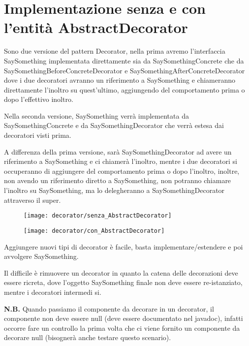 \section{Implementazione senza e con l'entità AbstractDecorator}

Sono due versione del pattern Decorator, nella prima avremo l'interfaccia SaySomething implementata direttamente sia da SaySomethingConcrete che da 
SaySomethingBeforeConcreteDecorator e SaySomethingAfterConcreteDecorator dove i due decoratori avranno un riferimento a SaySomething e chiameranno direttamente 
l'inoltro su quest'ultimo, aggiungendo del comportamento prima o dopo l'effettivo inoltro.

Nella seconda versione, SaySomething verrà implementata da SaySomethingConcrete e da SaySomethingDecorator che verrà estesa dai decoratori visti prima.

A differenza della prima versione, sarà SaySomethingDecorator ad avere un riferimento a SaySomething e ci chiamerà l'inoltro, mentre i due decoratori si occuperanno di 
aggiungere del comportamento prima o dopo l'inoltro, inoltre, non avendo un riferimento diretto a SaySomething, non potranno chiamare l'inoltro su SaySomething, ma lo 
delegheranno a SaySomethingDecorator attraverso il super.

\begin{figure}[H]
\begin{minipage}[c]{9cm}
    \texttt{[image: decorator/senza\_AbstractDecorator]}
\end{minipage}
\hfill
\begin{minipage}[c]{8cm}
    \texttt{[image: decorator/con\_AbstractDecorator]}
\end{minipage}
\end{figure}

Aggiungere nuovi tipi di decorator è facile, basta implementare/estendere e poi avvolgere SaySomething.

Il difficile è rimuovere un decorator in quanto la catena delle decorazioni deve essere ricreta, dove l'oggetto SaySomething finale non deve essere re-istanziato, 
mentre i decoratori intermedi si.
\medskip

\textbf{N.B.} Quando passiamo il componente da decorare in un decorator, il componente non deve essere null (deve essere documentato nel javadoc), infatti occorre 
fare un controllo la prima volta che ci viene fornito un componente da decorare null (bisognerà anche testare questo scenario).

